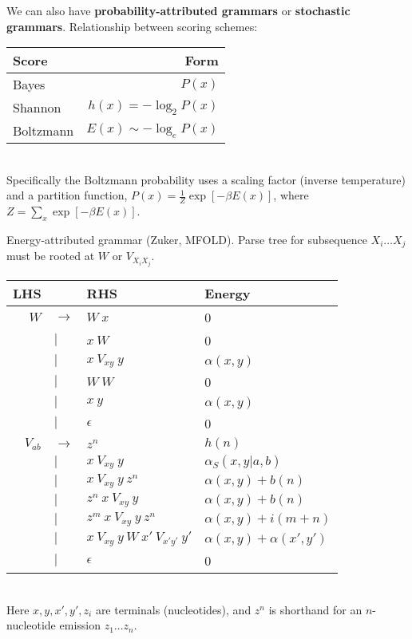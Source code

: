 \documentclass{beamer}
\begin{document}
\begin{frame}{}
We can also have {\bf probability-attributed grammars} or {\bf stochastic grammars}.
Relationship between scoring schemes:
\\
\begin{tabular}{l|r}
Score & Form \\
\hline
Bayes     & $P(x)$ \\
Shannon   & $h(x) = -\log_2 P(x)$ \\
Boltzmann & $E(x) \sim -\log_e P(x)$
\end{tabular}
\\
Specifically the Boltzmann probability uses a scaling factor (inverse temperature) and a partition function,
$P(x) = \frac{1}{Z} \exp[-\beta E(x)]$,
where $Z = \sum_x \exp[-\beta E(x)]$.
\end{frame}
\begin{frame}{}
Energy-attributed grammar (Zuker, MFOLD).
Parse tree for subsequence $X_i \ldots X_j$ must be rooted at $W$ or $V_{X_i X_j}$.
\\
\tiny
\begin{tabular}{rll|l}
LHS & & RHS & Energy \\
\hline
$W$ & $\to$ & $W\ x$         & 0 \\
    &   $|$ & $x\ W$         & 0 \\
    &   $|$ & $x\ V_{xy}\ y$ & $\alpha(x,y)$ \\
    &   $|$ & $W\ W$         & 0 \\
    &   $|$ & $x\ y$         & $\alpha(x,y)$ \\
    &   $|$ & $\epsilon$     & 0 \\
$V_{ab}$ & $\to$ & $z^n$                               & $h(n)$ \\
         &   $|$ & $x\ V_{xy}\ y$                      & $\alpha_S(x,y|a,b)$ \\
         &   $|$ & $x\ V_{xy}\ y\ z^n$                 & $\alpha(x,y) + b(n)$ \\
         &   $|$ & $z^n\ x\ V_{xy}\ y$                 & $\alpha(x,y) + b(n)$ \\
         &   $|$ & $z^m\ x\ V_{xy}\ y\ z^n$            & $\alpha(x,y) + i(m+n)$ \\
         &   $|$ & $x\ V_{xy}\ y\ W\ x'\ V_{x'y'}\ y'$ & $\alpha(x,y) + \alpha(x',y')$ \\
         &   $|$ & $\epsilon$                          & 0
\end{tabular}
\normalsize
\\
Here $x,y,x',y',z_i$ are terminals (nucleotides), and $z^n$ is shorthand for an $n$-nucleotide emission $z_1 \ldots z_n$.
\end{frame}
\end{document}
